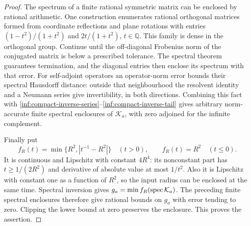 \begin{proof}
The spectrum of a finite rational symmetric matrix can be enclosed
by rational arithmetic. One construction enumerates rational
orthogonal matrices formed from coordinate reflections and plane
rotations with entries
$(1-t^2)/(1+t^2)$ and $2t/(1+t^2)$, $t\in\mathbb Q$.
This family is dense in the orthogonal group. Continue until the
off-diagonal Frobenius norm of the conjugated matrix is below a
prescribed tolerance. The spectral theorem guarantees termination,
and the diagonal entries then enclose its spectrum with that error.
For self-adjoint operators an operator-norm error bounds their
spectral Hausdorff distance: outside that neighbourhood the
resolvent identity and a Neumann series give invertibility, in both
directions. Combining this fact with
\eqref{inf:compact-inverse-series}--\eqref{inf:compact-inverse-tail}
gives arbitrary norm-accurate finite spectral enclosures of
$\mathcal K_a$, with zero adjoined for the infinite complement.

Finally put
\[
 f_R(t)=\min\{R^2,|t^{-1}-R^2|\}\quad(t>0),\qquad
 f_R(t)=R^2\quad(t\le0).
\]
It is continuous and Lipschitz with constant $4R^4$: its nonconstant
part has $t\ge1/(2R^2)$ and derivative of absolute value at most
$1/t^2$. Also it is Lipschitz with constant one as a function of
$R^2$, so the input radius can be enclosed at the same time.
Spectral inversion gives
$g_a=\min f_R(\operatorname{spec}\mathcal K_a)$.
The preceding finite spectral enclosures therefore give rational
bounds on $g_a$ with error tending to zero. Clipping the lower bound
at zero preserves the enclosure. This proves the assertion.
\end{proof}

